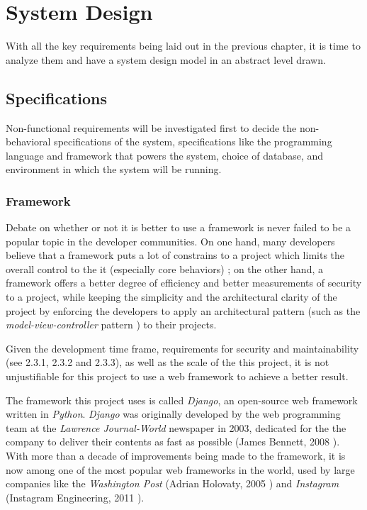 

\chapter{System Design}
\label{chap:SYSDES}

With all the key requirements being laid out in the previous chapter, it is
time to analyze them and have a system design model in an abstract
level drawn. 

\section{Specifications}
Non-functional requirements will be investigated first to decide the
non-behavioral specifications of the system, specifications like the
programming language and framework that powers the system, choice of database,
and environment in which the system will be running.

\subsection{Framework}
Debate on whether or not it is better to use a framework is never failed to be
a popular topic in the developer communities. On one hand, many developers
believe that a framework puts a lot of constrains to a project which limits the
overall control to the it (especially core behaviors) \cite{frameworks};
on the other hand, a framework offers a better degree of efficiency and better
measurements of security to a project, while keeping the simplicity and
the architectural clarity of the project by enforcing the developers to apply
an architectural pattern (such as the \emph{model-view-controller} pattern
\cite{mvc}) to their projects.

\medskip

Given the development time frame, requirements for
security and maintainability (see 2.3.1, 2.3.2 and 2.3.3),
as well as the scale of the this project,
it is not unjustifiable for this project to use a web framework to achieve a
better result.

\medskip

The framework this project uses is called \emph{Django}, an open-source web
framework written in \emph{Python}. \emph{Django} was originally developed by
the web programming team at the \emph{Lawrence Journal-World} newspaper in 2003,
dedicated for the the company to deliver their contents as fast as possible
(James Bennett, 2008 \cite{django}). With more than a decade of improvements
being made to the framework, it is now among one of the most popular web
frameworks in the world, used by large companies like the
\emph{Washington Post} (Adrian Holovaty, 2005 \cite{djangoWashingtonPost})
and \emph{Instagram} (Instagram Engineering, 2011 \cite{djangoInstagram}).
\medskip

